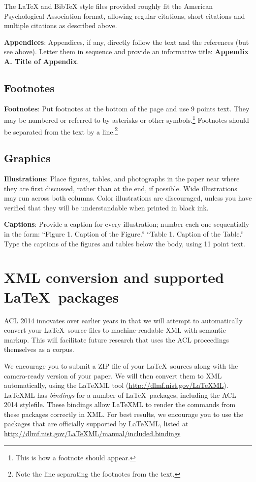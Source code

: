 \documentclass[11pt]{article}
\begin{document}
The \LaTeX{} and Bib\TeX{} style files provided roughly fit the
American Psychological Association format, allowing regular citations, 
short citations and multiple citations as described above.

{\bf Appendices}: Appendices, if any, directly follow the text and the
references (but see above).  Letter them in sequence and provide an
informative title: {\bf Appendix A. Title of Appendix}.

\subsection{Footnotes}

{\bf Footnotes}: Put footnotes at the bottom of the page and use 9
points text. They may be numbered or referred to by asterisks or other
symbols.\footnote{This is how a footnote should appear.} Footnotes
should be separated from the text by a line.\footnote{Note the line
separating the footnotes from the text.}

\subsection{Graphics}

{\bf Illustrations}: Place figures, tables, and photographs in the
paper near where they are first discussed, rather than at the end, if
possible.  Wide illustrations may run across both columns.  Color
illustrations are discouraged, unless you have verified that  
they will be understandable when printed in black ink.

{\bf Captions}: Provide a caption for every illustration; number each one
sequentially in the form:  ``Figure 1. Caption of the Figure.'' ``Table 1.
Caption of the Table.''  Type the captions of the figures and 
tables below the body, using 11 point text.


\section{XML conversion and supported \LaTeX\ packages}

ACL 2014 innovates over earlier years in that we will attempt to
automatically convert your \LaTeX\ source files to machine-readable
XML with semantic markup. This will facilitate future research that
uses the ACL proceedings themselves as a corpus.

We encourage you to submit a ZIP file of your \LaTeX\ sources along
with the camera-ready version of your paper. We will then convert them
to XML automatically, using the LaTeXML tool
(\url{http://dlmf.nist.gov/LaTeXML}). LaTeXML has \emph{bindings} for
a number of \LaTeX\ packages, including the ACL 2014 stylefile. These
bindings allow LaTeXML to render the commands from these packages
correctly in XML. For best results, we encourage you to use the
packages that are officially supported by LaTeXML, listed at
\url{http://dlmf.nist.gov/LaTeXML/manual/included.bindings}
\end{document}
